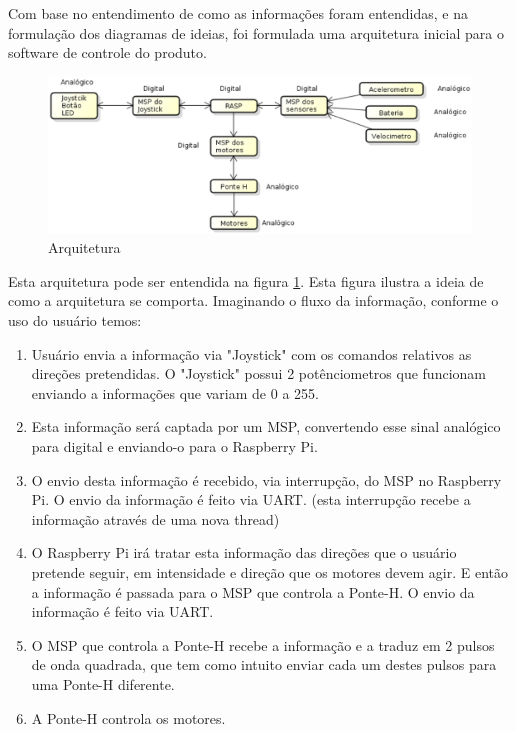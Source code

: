 Com base no entendimento de como as informações foram entendidas, e na formulação dos diagramas de ideias, foi formulada uma arquitetura inicial para o software de controle do produto.

\begin{figure}[!htb]
\centering
  \includegraphics[keepaspectratio=true,scale=0.75]{figuras/resultados/arquitetura}
\caption{Arquitetura}
\label{fig:arquitetura}
\end{figure}

Esta arquitetura pode ser entendida na figura \ref{fig:arquitetura}. Esta figura ilustra a ideia de como a arquitetura se comporta. Imaginando o fluxo da informação, conforme o uso do usuário temos:

\begin{enumerate}
  \item Usuário envia a informação via "Joystick" com os comandos relativos as direções pretendidas. O "Joystick" possui 2 potênciometros que funcionam enviando a informações que variam de 0 a 255.
  \item Esta informação será captada por um MSP, convertendo esse sinal analógico para digital e enviando-o para o Raspberry Pi.
  \item O envio desta informação é recebido, via interrupção, do MSP no Raspberry  Pi. O envio da informação é feito via UART. (esta interrupção recebe a informação através de uma nova thread)
  \item O Raspberry Pi irá tratar esta informação das direções que o usuário pretende seguir, em intensidade e direção que os motores devem agir. E então a informação é passada para o MSP que controla a Ponte-H. O envio da  informação é feito via UART.
  \item O MSP que controla a Ponte-H recebe a informação e a traduz em 2 pulsos de onda quadrada, que tem como intuito enviar cada um destes pulsos para uma Ponte-H diferente.
  \item A Ponte-H controla os motores.
\end{enumerate}

